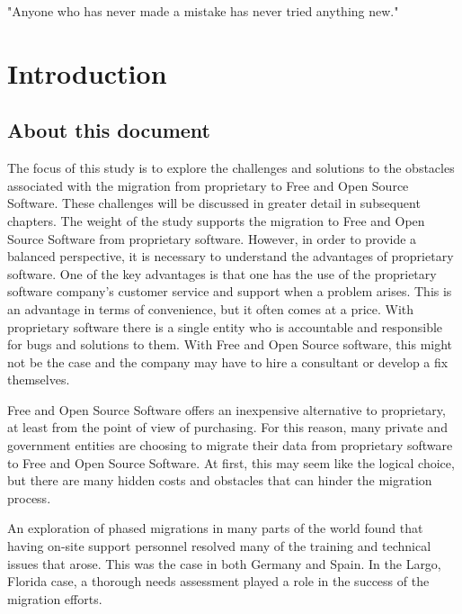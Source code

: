 \newpage
\begin{savequote}[108mm]
 "Anyone who has never made a mistake has never tried anything new." 
\end{savequote}
\chapter{Introduction}
\vspace{-3cm}
\label{chap:introduction}
  \section{About this document}
  \label{sec:about}
  The focus of this study is to explore the challenges and solutions to the obstacles associated with the migration from proprietary to Free and Open Source Software. These challenges will be discussed in greater detail in subsequent chapters. The weight of the study supports the migration to Free and Open Source Software from proprietary software. However, in order to provide a balanced perspective, it is necessary to understand the advantages of proprietary software. One of the key advantages is that one has the use of the proprietary software company's customer service and support when a problem arises. This is an advantage in terms of convenience, but it often comes at a price. With proprietary software there is a single entity who is accountable and responsible for bugs and solutions to them. With Free and Open Source software, this might not be the case and the company may have to hire a consultant or develop a fix themselves.  

  Free and Open Source Software offers an inexpensive alternative to proprietary, at least from the point of view of purchasing. For this reason, many private and government entities are choosing to migrate their data from proprietary software to Free and Open Source Software.  At first, this may seem like the logical choice, but there are many hidden costs and obstacles that can hinder the migration process. 

  An exploration of phased migrations in many parts of the world found that having on-site support personnel resolved many of the training and technical issues that arose. This was the case in both Germany and Spain. In the Largo, Florida case, a thorough needs assessment played a role in the success of the migration efforts.

